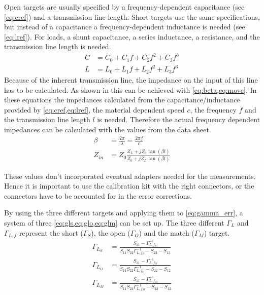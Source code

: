 \documentclass[12pt,a4paper,parskip=full,abstract=true,BCOR=10mm,twoside,open=right]{scrreprt}
\begin{document}
Open targets are usually specified by a frequency-dependent capacitance (see
\cref{eq:cref}) and a transmission line length. Short targets use the same
specifications, but instead of a capacitance a frequency-dependent inductance is
needed (see \cref{eq:lref}). For loads, a shunt capacitance, a series inductance,
a resistance, and the transmission line length is needed.
\begin{align}
    \label{eq:cref} C & = C_0 + C_1 f + C_2 f^2 + C_3 f^3 \\
    \label{eq:lref} L & = L_0 + L_1 f + L_2 f^2 + L_3 f^3
\end{align}
Because of the inherent transmission line, the impedance on the input of this
line has to be calculated. As shown in \cite{pozar_mw_engineering_2011} this
can be achieved with \cref{eq:beta,eq:move}. In these equations the impedances
calculated from the capacitance/inductance provided by \cref{eq:cref,eq:lref},
the material dependent speed $c$, the frequency $f$ and the transmission line
length $l$ is needed. Therefore the actual frequency dependent impedances can
be calculated with the values from the data sheet.
\begin{align}
    \label{eq:beta} \beta & = \frac{2 \pi}{\lambda} = \frac{2 \pi f}{c}\\
    \label{eq:move} Z_{in} & = Z_0 \frac{Z_L + j Z_0 \tan(\beta l)}{Z_0 + j Z_L \tan(\beta l)}
\end{align}

These values don't incorporated eventual adapters needed for the measurements.
Hence it is important to use the calibration kit with the right connectors, or
the connectors have to be accounted for in the error corrections.

By using the three different targets and applying them to \cref{eq:gamma_err},
a system of three \cref{eq:gls,eq:glo,eq:glm} can be set up. The
three different $\Gamma_L$ and $\Gamma_{L,f}$ represent the short ($\Gamma_S$),
the open ($\Gamma_O$) and the match ($\Gamma_M$) target.
\begin{align}
    \label{eq:gls} \Gamma_{L_S} & = \frac{S_{11} - \Gamma_{L,f_S}^{-1}}{S_{11} S_{22}\Gamma_{L,f_S}^{-1} - S_{22} - S_{12}} \\
    \label{eq:glo} \Gamma_{L_O} & = \frac{S_{11} - \Gamma_{L,f_O}^{-1}}{S_{11} S_{22}\Gamma_{L,f_O}^{-1} - S_{22} - S_{12}} \\
    \label{eq:glm} \Gamma_{L_M} & = \frac{S_{11} - \Gamma_{L,f_M}^{-1}}{S_{11} S_{22}\Gamma_{L,f_M}^{-1} - S_{22} - S_{12}}
\end{align}
\end{document}
